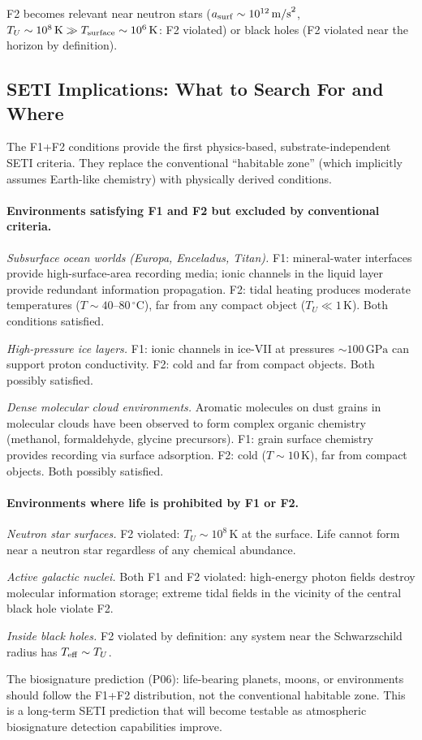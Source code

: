\documentclass[12pt,a4paper]{article}
\begin{document}
F2 becomes relevant near neutron stars ($a_{\rm surf}\sim10^{12}\,\mathrm{m/s}^2$, $T_U\sim10^8\,\mathrm{K}\gg T_{\rm surface}\sim10^6\,\mathrm{K}$: F2 violated) or black holes (F2 violated near the horizon by definition).

\subsection{SETI Implications: What to Search For and Where}

The F1+F2 conditions provide the first physics-based, substrate-independent SETI criteria.  They replace the conventional ``habitable zone'' (which implicitly assumes Earth-like chemistry) with physically derived conditions.

\paragraph{Environments satisfying F1 and F2 but excluded by conventional criteria.}

\textit{Subsurface ocean worlds (Europa, Enceladus, Titan).}  F1: mineral-water interfaces provide high-surface-area recording media; ionic channels in the liquid layer provide redundant information propagation.  F2: tidal heating produces moderate temperatures ($T\sim40$--$80\,^\circ\mathrm{C}$), far from any compact object ($T_U\ll1\,\mathrm{K}$).  Both conditions satisfied.

\textit{High-pressure ice layers.}  F1: ionic channels in ice-VII at pressures $\sim100\,\mathrm{GPa}$ can support proton conductivity.  F2: cold and far from compact objects.  Both possibly satisfied.

\textit{Dense molecular cloud environments.}  Aromatic molecules on dust grains in molecular clouds have been observed to form complex organic chemistry (methanol, formaldehyde, glycine precursors).  F1: grain surface chemistry provides recording via surface adsorption.  F2: cold ($T\sim10\,\mathrm{K}$), far from compact objects.  Both possibly satisfied.

\paragraph{Environments where life is prohibited by F1 or F2.}

\textit{Neutron star surfaces.}  F2 violated: $T_U\sim10^8\,\mathrm{K}$ at the surface.  Life cannot form near a neutron star regardless of any chemical abundance.

\textit{Active galactic nuclei.}  Both F1 and F2 violated: high-energy photon fields destroy molecular information storage; extreme tidal fields in the vicinity of the central black hole violate F2.

\textit{Inside black holes.}  F2 violated by definition: any system near the Schwarzschild radius has $T_{\rm eff}\sim T_U$.

The biosignature prediction (P06): life-bearing planets, moons, or environments should follow the F1+F2 distribution, not the conventional habitable zone.  This is a long-term SETI prediction that will become testable as atmospheric biosignature detection capabilities improve.
\end{document}
